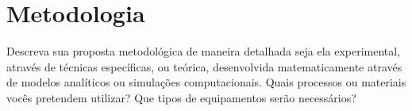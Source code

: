 \documentclass[12pt,oneside,brazil,hidelinks,article,sumario=tradicional,a4paper]{abntex2}
\begin{document}







\section{Metodologia}

Descreva sua proposta metodológica de maneira detalhada seja ela experimental, através de técnicas específicas, ou teórica, desenvolvida matematicamente através de modelos analíticos ou simulações computacionais. Quais processos ou materiais vocês pretendem utilizar? Que tipos de equipamentos serão necessários?


\end{document}
